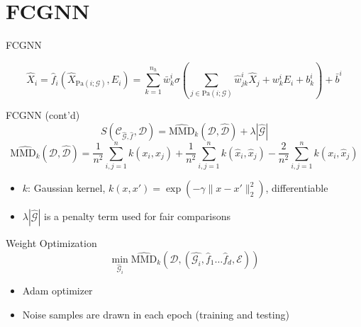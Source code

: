 \documentclass{beamer}
\begin{document}
\section{FCGNN}
\begin{frame}{FCGNN}
	\begin{figure}[ht]
		\centering
		\scalebox{0.9}{}
		\caption*{\label{fig:FCGNN-arch} }
	\end{figure}
	\vspace{-1cm}
	\[\hat{X}_i  =  \hat{f}_i(\hat{X}_{\text{Pa}(i;\mathscr{G})}, E_i)
		=  \sum_{k=1}^{n_h} \bar{w}^{i}_k \sigma \left(\sum_{j \in \text{Pa}(i;\mathscr{G})} \hat{w}^{i}_{jk} \hat{X}_j
		+ w^{i}_{k} E_i +  b^{i}_k \right) +\bar{b}^{i}
	\]
\end{frame}
\begin{frame}{FCGNN (cont'd)}
	\[
		S(\mathscr{C}_{\hat{\mathscr{G}},\hat{f}}, \mathscr{D}) =
		\widehat{\text{MMD}}_k(\mathscr{D}, \widehat{\mathscr{D}}) + \lambda
		|\widehat{\mathscr{G}}|
	\]
	\[
		\widehat{\text{MMD}_k}(\mathscr{D}, \widehat{\mathscr{D}}) =
		\frac{1}{n^2} \sum_{i, j = 1}^{n} k(x_i, x_j) +
		\frac{1}{n^2} \sum_{i, j = 1}^{n} k(\hat{x}_i, \hat{x}_j)
		- \frac{2}{n^2} \sum_{i,j = 1}^n k(x_i, \hat{x}_j)
	\]
	\begin{itemize}
		\item $k$: Gaussian kernel, $k(x,x') = \exp(-\gamma \|x-x'\|_2^2)$, differentiable
		\item $\lambda|\widehat{\mathscr{G}}|$ is a penalty term used for fair comparisons
	\end{itemize}
\end{frame}
\begin{frame}{Weight Optimization}
	\[
		\min _{ \hat{\mathscr{G} }_{ i } }{ \widehat{\text{MMD}}_{k}(\mathscr{D}, (\hat{\mathscr{G}_{i}}, \hat{f}_{1} \dots \hat{f}_{d}, \mathscr{E})) }
	\]
	\begin{itemize}
		\item Adam optimizer
		\item Noise samples are drawn in each epoch (training and testing)
	\end{itemize}
\end{frame}
\end{document}
